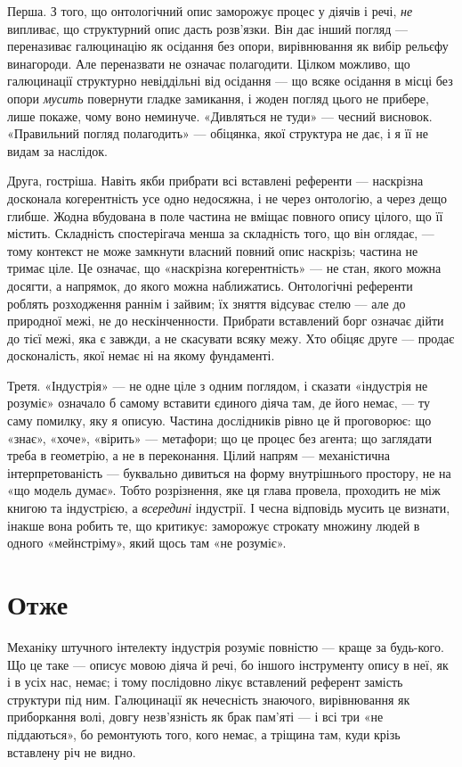 \documentclass[12pt, a4paper, openany]{book}
\begin{document}
Перша. З того, що онтологічний опис заморожує процес у діячів і речі, \emph{не} випливає, що структурний опис дасть розв'язки. Він дає інший погляд --- переназиває галюцинацію як осідання без опори, вирівнювання як вибір рельєфу винагороди. Але переназвати не означає полагодити. Цілком можливо, що галюцинації структурно невіддільні від осідання --- що всяке осідання в місці без опори \emph{мусить} повернути гладке замикання, і жоден погляд цього не прибере, лише покаже, чому воно неминуче. «Дивляться не туди» --- чесний висновок. «Правильний погляд полагодить» --- обіцянка, якої структура не дає, і я її не видам за наслідок.

Друга, гостріша. Навіть якби прибрати всі вставлені референти --- наскрізна досконала когерентність усе одно недосяжна, і не через онтологію, а через дещо глибше. Жодна вбудована в поле частина не вміщає повного опису цілого, що її містить. Складність спостерігача менша за складність того, що він оглядає, --- тому контекст не може замкнути власний повний опис наскрізь; частина не тримає ціле. Це означає, що «наскрізна когерентність» --- не стан, якого можна досягти, а напрямок, до якого можна наближатись. Онтологічні референти роблять розходження раннім і зайвим; їх зняття відсуває стелю --- але до природної межі, не до нескінченности. Прибрати вставлений борг означає дійти до тієї межі, яка є завжди, а не скасувати всяку межу. Хто обіцяє друге --- продає досконалість, якої немає ні на якому фундаменті.

Третя. «Індустрія» --- не одне ціле з одним поглядом, і сказати «індустрія не розуміє» означало б самому вставити єдиного діяча там, де його немає, --- ту саму помилку, яку я описую. Частина дослідників рівно це й проговорює: що «знає», «хоче», «вірить» --- метафори; що це процес без агента; що заглядати треба в геометрію, а не в переконання. Цілий напрям --- механістична інтерпретованість --- буквально дивиться на форму внутрішнього простору, не на «що модель думає». Тобто розрізнення, яке ця глава провела, проходить не між книгою та індустрією, а \emph{всередині} індустрії. І чесна відповідь мусить це визнати, інакше вона робить те, що критикує: заморожує строкату множину людей в одного «мейнстріму», який щось там «не розуміє».

\section{Отже}

Механіку штучного інтелекту індустрія розуміє повністю --- краще за будь-кого. Що це таке --- описує мовою діяча й речі, бо іншого інструменту опису в неї, як і в усіх нас, немає; і тому послідовно лікує вставлений референт замість структури під ним. Галюцинації як нечесність знаючого, вирівнювання як приборкання волі, довгу незв'язність як брак пам'яті --- і всі три «не піддаються», бо ремонтують того, кого немає, а тріщина там, куди крізь вставлену річ не видно.
\end{document}
